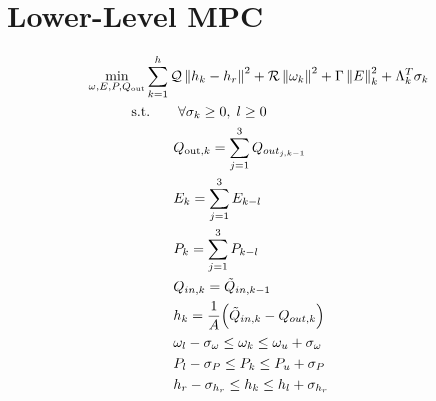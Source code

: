 \section{Lower-Level MPC}
\begin{subequations}\label{P2:FinalModel}
    \begin{align}
        \underset{\omega, E, P, Q_{\text{out}}}{\text{min}}& \sum_{k=1}^{h} \mathcal{Q} \left\lVert h_k - h_r \right\rVert^2 + \mathcal{R} \left\lVert \omega_k \right\rVert^2 + \Gamma \left\lVert E \right\rVert^{2}_{k} + \Lambda_k^T \sigma_k  \label{P2:0} \\
        &\hspace{-1em} \text{s.t.}  \quad \quad \forall \sigma_k \geq 0, \; l \geq 0 \label{P2:1} \\
		& \qquad Q_{\text{out}, k} = \sum_{j=1}^3 Q_{out_{j,k-1}} \label{P2:2} \\
        & \qquad E_{k} = \sum_{j=1}^3 E_{k-l} \label{P2:3}  \\
        & \qquad P_{k} = \sum_{j=1}^3 P_{k-l} \label{P2:4}  \\
        & \qquad Q_{in,k} = \tilde{Q}_{in,k-1} \label{P2:5}  \\
        & \qquad h_k = \frac{1}{A} \Big(\tilde{Q}_{in,k} - Q_{out,k}\Big) \label{P2:5} \\
		& \qquad \omega_{l} - \sigma_{\omega} \leq \omega_k \leq \omega_{u} + \sigma_{\omega} \label{P2:6} \\
		& \qquad P_{l} - \sigma_{P} \leq P_k \leq P_{u} + \sigma_{P} \label{P2:7} \\
		& \qquad h_{r} - \sigma_{h_{r}} \leq h_k \leq h_{l} + \sigma_{h_{r}} \label{P2:8}
\end{align}
\end{subequations}